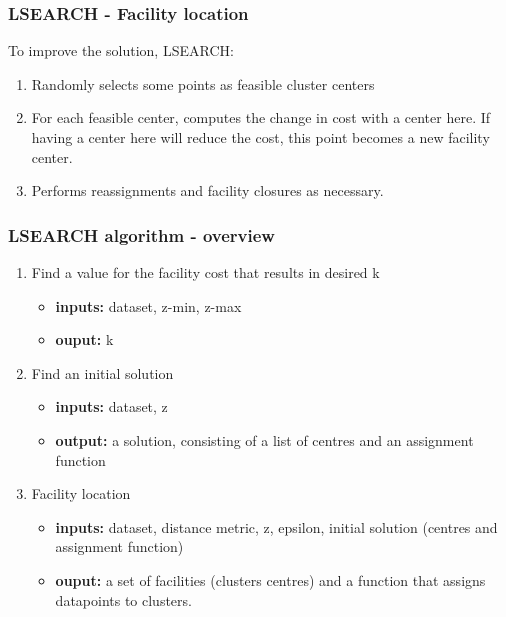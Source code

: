 \documentclass{beamer}
\begin{document}
\frame
{
  \frametitle{LSEARCH - Facility location}
  To improve the solution, LSEARCH:
  
  \bigskip
  \begin{enumerate}
  	\item{Randomly selects some points as feasible cluster centers}
  	\item{For each feasible center, computes the change in cost with a center 
  	here. If having a center here will reduce the cost, this point becomes a new facility
  	center.}
  	\item{Performs reassignments and facility closures as necessary. }
  \end{enumerate}
}

\frame
    {
      \frametitle{LSEARCH algorithm - overview}
      \begin{enumerate}
      \item Find a value for the facility cost that results in desired k
        \begin{itemize}
        \item {\bf inputs:} dataset, z-min, z-max
        \item {\bf ouput:} k
        \end{itemize}

      \item Find an initial solution
        \begin{itemize}
        \item {\bf inputs:} dataset, z
        \item {\bf output:} a solution, consisting of a list of
          centres and an assignment function
        \end{itemize}
        
      \item Facility location
        \begin{itemize}
        \item {\bf inputs:} dataset, distance metric, z, epsilon, initial solution (centres
        and assignment function)
        \item {\bf ouput:} a set of facilities (clusters centres) and a function
          that assigns datapoints to clusters.
        \end{itemize}
   \end{enumerate}
    }
    
\end{document}
